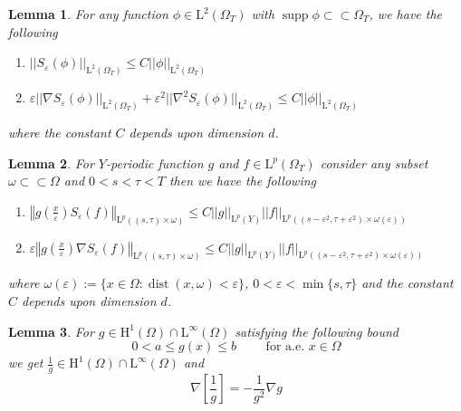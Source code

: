 \documentclass[10pt,a4paper]{amsart}
\newtheorem{lemma}{Lemma}
\DeclareMathOperator{\dist}{dist}
\newcommand{\eps}{\varepsilon}
\DeclareMathOperator{\supp}{supp}
\newcommand{\xeps}{\left(\frac{x}{\varepsilon}\right)}
\begin{document}
\begin{lemma}\label{smooth: compact support}
For any function $\phi \in \mathrm{L}^{2}(\Omega_T)$ with $\supp{\phi} \subset \subset \Omega_T$, we have the following
\begin{enumerate}
\item $|| S_{\eps}(\phi)||_{\mathrm{L}^2(\Omega_T)} \leq C ||\phi||_{\mathrm{L}^2(\Omega_T)}$
\item $\eps || \nabla S_{\eps}(\phi)||_{\mathrm{L}^2(\Omega_T)} + \eps^2 || \nabla^2 S_{\eps}(\phi)||_{\mathrm{L}^2(\Omega_T)} \leq C ||\phi||_{\mathrm{L}^2(\Omega_T)}$
\end{enumerate}
where the constant $C$ depends upon dimension $d$.
\end{lemma}

\begin{lemma}\label{smooth: extension}
For $Y$-periodic function $g$ and $f \in \mathrm{L}^{p}(\Omega_T)$ consider any subset $\omega \subset \subset \Omega$ and $0<s<\tau<T$ then we have the following
\begin{enumerate}
\item $\left\Vert g\xeps S_{\eps}(f) \right\Vert_{\mathrm{L}^p((s,\tau)\times \omega)} \leq C ||g||_{\mathrm{L}^p(Y)} || f ||_{\mathrm{L}^p((s-\eps^2, \tau + \eps^2)\times\omega(\eps))}$
\item $\eps\left\Vert g\xeps \nabla S_{\eps}(f) \right\Vert_{\mathrm{L}^p((s,\tau)\times \omega)} \leq C ||g||_{\mathrm{L}^p(Y)} || f ||_{\mathrm{L}^p((s-\eps^2, \tau + \eps^2)\times\omega(\eps))}$
\end{enumerate}
where $\omega(\eps):=\{x\in \Omega: \dist(x,\omega)<\eps\}$, $0<\eps <\min\{s,\tau\}$ and the constant $C$ depends upon dimension $d$.
\end{lemma}

\begin{lemma}\label{lemma: quotient}
For $g \in \mathrm H^1(\Omega) \cap \mathrm L^{\infty}(\Omega)$ satisfying the following bound
\[
0 < a \leq g(x) \leq b \qquad \text{ for a.e. } x \in \Omega
\]
we get $\frac{1}{g} \in \mathrm H^1(\Omega) \cap \mathrm L^{\infty}(\Omega) $ and 
\[
\nabla \left[\frac{1}{g}\right] = - \frac{1}{g^2} \nabla g
\]
\end{lemma}
\end{document}
